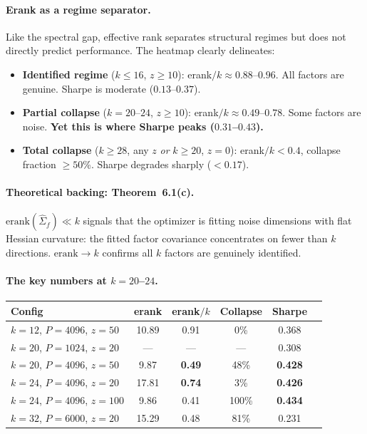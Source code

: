 \documentclass[11pt,a4paper]{article}
\begin{document}
\paragraph{Erank as a regime separator.}
Like the spectral gap, effective rank separates structural regimes but does not directly predict performance.  The heatmap clearly delineates:
\begin{itemize}[nosep]
  \item \textbf{Identified regime} ($k \leq 16$, $z \geq 10$): erank$/k \approx 0.88$--$0.96$.  All factors are genuine.  Sharpe is moderate ($0.13$--$0.37$).
  \item \textbf{Partial collapse} ($k = 20$--$24$, $z \geq 10$): erank$/k \approx 0.49$--$0.78$.  Some factors are noise.  \textbf{Yet this is where Sharpe peaks ($0.31$--$0.43$).}
  \item \textbf{Total collapse} ($k \geq 28$, any $z$ \emph{or} $k \geq 20$, $z = 0$): erank$/k < 0.4$, collapse fraction $\geq 50$\%.  Sharpe degrades sharply ($< 0.17$).
\end{itemize}

\paragraph{Theoretical backing: Theorem~6.1(c).}
$\mathrm{erank}(\hat\Sigma_f) \ll k$ signals that the optimizer is fitting noise dimensions with flat Hessian curvature: the fitted factor covariance concentrates on fewer than $k$ directions.  $\mathrm{erank} \to k$ confirms all $k$ factors are genuinely identified.

\paragraph{The key numbers at $k = 20$--$24$.}
\begin{center}
\small
\begin{tabular}{lccccc}
\toprule
Config & erank & erank$/k$ & Collapse & Sharpe \\
\midrule
$k = 12$, $P = 4096$, $z = 50$ & 10.89 & 0.91 & 0\% & 0.368 \\
$k = 20$, $P = 1024$, $z = 20$ & --- & --- & --- & 0.308 \\
$k = 20$, $P = 4096$, $z = 50$ & 9.87 & \textbf{0.49} & 48\% & \textbf{0.428} \\
$k = 24$, $P = 4096$, $z = 20$ & 17.81 & \textbf{0.74} & 3\% & \textbf{0.426} \\
$k = 24$, $P = 4096$, $z = 100$ & 9.86 & 0.41 & 100\% & \textbf{0.434} \\
$k = 32$, $P = 6000$, $z = 20$ & 15.29 & 0.48 & 81\% & 0.231 \\
\bottomrule
\end{tabular}
\end{center}
\end{document}
